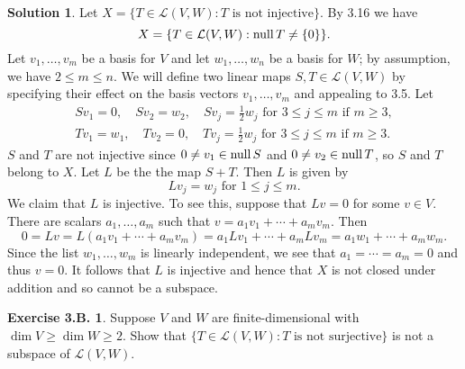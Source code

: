 \documentclass[12pt]{article}
\theoremstyle{definition}
\theoremstyle{exercise}
\newtheorem{exercise}{Exercise 3.B.}
\theoremstyle{solution}
\newtheorem*{solution}{Solution}
\newcommand{\lmap}{\mathcal{L}}
\newcommand{\Null}{\text{null\,}}
\begin{document}
\begin{solution}
    Let \( X = \{ T \in \lmap(V, W) : T \text{ is not injective} \} \). By 3.16 we have
    \[
        X = \{ T \in \lmap(V, W) : \Null T \neq \{ 0 \} \}.
    \]
    Let \( v_1, \ldots, v_m \) be a basis for \( V \) and let \( w_1, \ldots, w_n \) be a basis for \( W \); by assumption, we have \( 2 \leq m \leq n \). We will define two linear maps \( S, T \in \lmap(V, W) \) by specifying their effect on the basis vectors \( v_1, \ldots, v_m \) and appealing to 3.5. Let
    \begin{gather*}
        Sv_1 = 0, \quad Sv_2 = w_2, \quad Sv_j = \tfrac{1}{2} w_j \text{ for } 3 \leq j \leq m \text{ if } m \geq 3, \\[2mm]
        Tv_1 = w_1, \quad Tv_2 = 0, \quad Tv_j = \tfrac{1}{2} w_j \text{ for } 3 \leq j \leq m \text{ if } m \geq 3.
    \end{gather*}
    \( S \) and \( T \) are not injective since \( 0 \neq v_1 \in \Null S \) and \( 0 \neq v_2 \in \Null T \), so \( S \) and \( T \) belong to \( X \). Let \( L \) be the the map \( S + T \). Then \( L \) is given by
    \[
        L v_j = w_j \text{ for } 1 \leq j \leq m.
    \]
    We claim that \( L \) is injective. To see this, suppose that \( Lv = 0 \) for some \( v \in V \). There are scalars \( a_1, \ldots, a_m \) such that \( v = a_1 v_1 + \cdots + a_m v_m \). Then
    \[
        0 = Lv = L(a_1 v_1 + \cdots + a_m v_m) = a_1 Lv_1 + \cdots + a_m Lv_m = a_1 w_1 + \cdots + a_m w_m.
    \]
    Since the list \( w_1, \ldots, w_m \) is linearly independent, we see that \( a_1 = \cdots = a_m = 0 \) and thus \( v = 0 \). It follows that \( L \) is injective and hence that \( X \) is not closed under addition and so cannot be a subspace.
\end{solution}

\begin{exercise}
\label{ex:8}
    Suppose \( V \) and \( W \) are finite-dimensional with \( \dim V \geq \dim W \geq 2 \). Show that \( \{ T \in \lmap(V, W) : T \text{ is not surjective} \} \) is not a subspace of \( \lmap(V, W) \).
\end{exercise}
\end{document}
